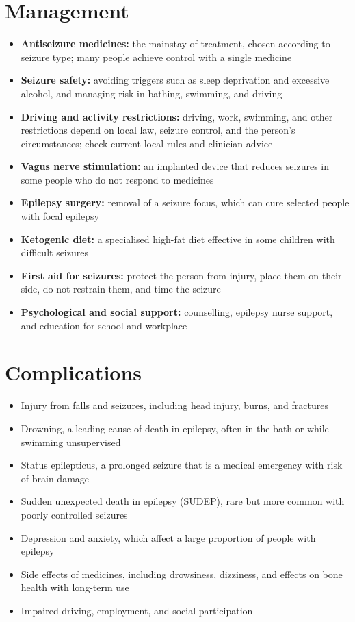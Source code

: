 \section*{Management}
\begin{itemize}
    \item \textbf{Antiseizure medicines:} the mainstay of treatment, chosen according to seizure type; many people achieve control with a single medicine
    \item \textbf{Seizure safety:} avoiding triggers such as sleep deprivation and excessive alcohol, and managing risk in bathing, swimming, and driving
    \item \textbf{Driving and activity restrictions:} driving, work, swimming, and other restrictions depend on local law, seizure control, and the person's circumstances; check current local rules and clinician advice
    \item \textbf{Vagus nerve stimulation:} an implanted device that reduces seizures in some people who do not respond to medicines
    \item \textbf{Epilepsy surgery:} removal of a seizure focus, which can cure selected people with focal epilepsy
    \item \textbf{Ketogenic diet:} a specialised high-fat diet effective in some children with difficult seizures
    \item \textbf{First aid for seizures:} protect the person from injury, place them on their side, do not restrain them, and time the seizure
    \item \textbf{Psychological and social support:} counselling, epilepsy nurse support, and education for school and workplace
\end{itemize}

\section*{Complications}
\begin{itemize}
    \item Injury from falls and seizures, including head injury, burns, and fractures
    \item Drowning, a leading cause of death in epilepsy, often in the bath or while swimming unsupervised
    \item Status epilepticus, a prolonged seizure that is a medical emergency with risk of brain damage
    \item Sudden unexpected death in epilepsy (SUDEP), rare but more common with poorly controlled seizures
    \item Depression and anxiety, which affect a large proportion of people with epilepsy
    \item Side effects of medicines, including drowsiness, dizziness, and effects on bone health with long-term use
    \item Impaired driving, employment, and social participation
\end{itemize}

